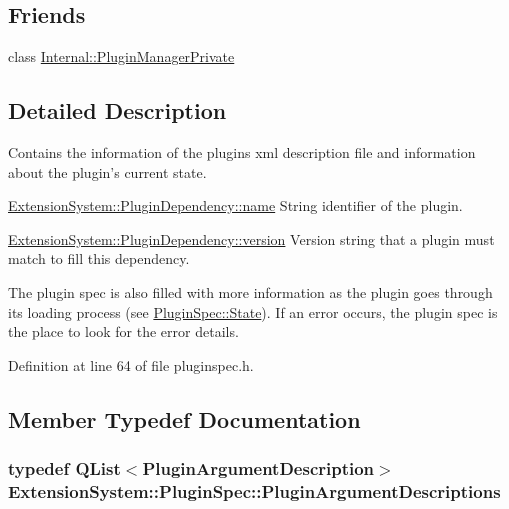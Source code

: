 \subsection*{Friends}
\begin{DoxyCompactItemize}
\item 
class \hyperlink{class_extension_system_1_1_plugin_spec_ac886620628a69def5b6d57fa12c39179}{Internal\-::\-Plugin\-Manager\-Private}
\end{DoxyCompactItemize}


\subsection{Detailed Description}
Contains the information of the plugins xml description file and information about the plugin's current state. 

\hyperlink{struct_extension_system_1_1_plugin_dependency_acd2cf6b00e6408b5fe155340a8159183}{Extension\-System\-::\-Plugin\-Dependency\-::name} String identifier of the plugin.

\hyperlink{struct_extension_system_1_1_plugin_dependency_a2d00bf5564134af5cb2eeddf2074eee8}{Extension\-System\-::\-Plugin\-Dependency\-::version} Version string that a plugin must match to fill this dependency.

The plugin spec is also filled with more information as the plugin goes through its loading process (see \hyperlink{class_extension_system_1_1_plugin_spec_a3d40e1bd1f17eb32b314bcd282b3e3b9}{Plugin\-Spec\-::\-State}). If an error occurs, the plugin spec is the place to look for the error details. 

Definition at line 64 of file pluginspec.\-h.



\subsection{Member Typedef Documentation}
\hypertarget{class_extension_system_1_1_plugin_spec_acf81cc5fcc20b047203f9da886cbbdee}{
\subsubsection[{Plugin\-Argument\-Descriptions}]{\setlength{\rightskip}{0pt plus 5cm}typedef {\bf Q\-List}$<${\bf Plugin\-Argument\-Description}$>$ {\bf Extension\-System\-::\-Plugin\-Spec\-::\-Plugin\-Argument\-Descriptions}}}\label{class_extension_system_1_1_plugin_spec_acf81cc5fcc20b047203f9da886cbbdee}


